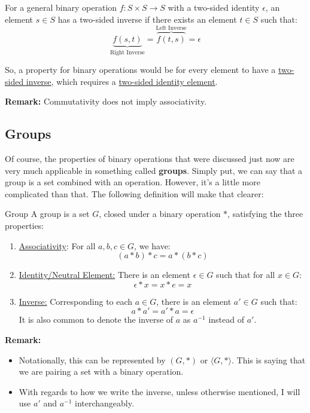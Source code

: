 \documentclass[letterpaper]{article}
\begin{document}
\begin{itemize}
    \bigskip 
    
    For a general binary operation $f: S \times S \to S$ with a two-sided identity $\epsilon$, an element $s \in S$ has a two-sided inverse if there exists an element $t \in S$ such that:
    \[\underbrace{f(s, t)}_{\text{Right Inverse}} = \overbrace{f(t, s)}^{\text{Left Inverse}} = \epsilon\] 

    So, a property for binary operations would be for every element to have a \underline{two-sided inverse}, which requires a \underline{two-sided identity element}.
\end{itemize}

\textbf{Remark:} Commutativity does not imply associativity.

\subsection{Groups}
Of course, the properties of binary operations that were discussed just now are very much applicable in something called \textbf{groups}. Simply put, we can say that a group is a set combined with an operation. However, it's a little more complicated than that. The following definition will make that clearer:
\begin{definition}{Group}{}
    A group is a set $G$, closed under a binary operation $*$, satisfying the three properties:
    \begin{enumerate}
        \item \underline{Associativity}: For all $a, b, c \in G$, we have:
        \[(a * b) * c = a * (b * c)\]

        \item \underline{Identity/Neutral Element:} There is an element $\epsilon \in G$ such that for all $x \in G$:
        \[\epsilon * x = x * e = x\]

        \item \underline{Inverse:} Corresponding to each $a \in G$, there is an element $a' \in G$ such that:
        \[a * a' = a' * a = \epsilon\]
        It is also common to denote the inverse of $a$ as $a^{-1}$ instead of $a'$.
    \end{enumerate}
\end{definition}
\textbf{Remark:}
\begin{itemize}
    \item Notationally, this can be represented by $(G, *)$ or $\langle G, * \rangle$. This is saying that we are pairing a set with a binary operation. 
    \item With regards to how we write the inverse, unless otherwise mentioned, I will use $a'$ and $a^{-1}$ interchangeably.
\end{itemize}
\end{document}
